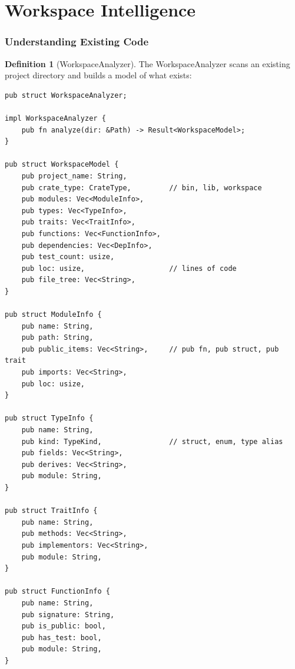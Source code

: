 \documentclass[11pt,a4paper,twoside]{article}
\theoremstyle{definition}
\newtheorem{definition}{Definition}[section]
\theoremstyle{plain}
\theoremstyle{remark}
\begin{document}
\part{Workspace Intelligence}\label{part:workspace}

\section{Understanding Existing Code}\label{sec:understand}

\begin{definition}[WorkspaceAnalyzer]\label{def:analyzer}
The WorkspaceAnalyzer scans an existing project directory and builds
a model of what exists:
\begin{lstlisting}
pub struct WorkspaceAnalyzer;

impl WorkspaceAnalyzer {
    pub fn analyze(dir: &Path) -> Result<WorkspaceModel>;
}

pub struct WorkspaceModel {
    pub project_name: String,
    pub crate_type: CrateType,         // bin, lib, workspace
    pub modules: Vec<ModuleInfo>,
    pub types: Vec<TypeInfo>,
    pub traits: Vec<TraitInfo>,
    pub functions: Vec<FunctionInfo>,
    pub dependencies: Vec<DepInfo>,
    pub test_count: usize,
    pub loc: usize,                    // lines of code
    pub file_tree: Vec<String>,
}

pub struct ModuleInfo {
    pub name: String,
    pub path: String,
    pub public_items: Vec<String>,     // pub fn, pub struct, pub trait
    pub imports: Vec<String>,
    pub loc: usize,
}

pub struct TypeInfo {
    pub name: String,
    pub kind: TypeKind,                // struct, enum, type alias
    pub fields: Vec<String>,
    pub derives: Vec<String>,
    pub module: String,
}

pub struct TraitInfo {
    pub name: String,
    pub methods: Vec<String>,
    pub implementors: Vec<String>,
    pub module: String,
}

pub struct FunctionInfo {
    pub name: String,
    pub signature: String,
    pub is_public: bool,
    pub has_test: bool,
    pub module: String,
}
\end{lstlisting}
\end{definition}
\end{document}
